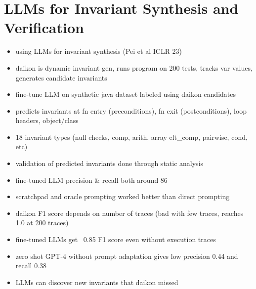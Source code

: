 
\setcounter{chapter}{3}
\chapter{LLMs for Invariant Synthesis and Verification}

\begin{itemize}
\item using LLMs for invariant synthesis (Pei et al ICLR 23)
\item daikon is dynamic invariant gen, runs program on 200 tests, tracks var values, generates candidate invariants
\item fine-tune LLM on synthetic java dataset labeled using daikon candidates
\item predicts invariants at fn entry (preconditions), fn exit (postconditions), loop headers, object/class
\item 18 invariant types (null checks, comp, arith, array elt_comp, pairwise, cond, etc)
\item validation of predicted invariants done through static analysis
\item fine-tuned LLM precision & recall both around 86%
\item scratchpad and oracle prompting worked better than direct prompting
\item daikon F1 score depends on number of traces (bad with few traces, reaches 1.0 at 200 traces)
\item fine-tuned LLMs get ~0.85 F1 score even without execution traces
\item zero shot GPT-4 without prompt adaptation gives low precision 0.44 and recall 0.38
\item LLMs can discover new invariants that daikon missed


\end{itemize}

